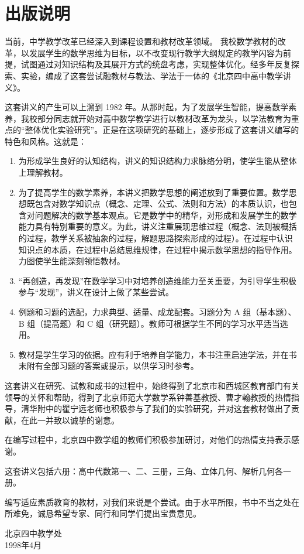 \chapter{出版说明}

当前，中学教学改革已经深入到课程设置和教材改革领域。
我校数学教材的改革，以发展学生的数学思维为目标，以不改变现行教学大纲规定的教学闪容为前提，试图通过对知识结构及其展开方式的统盘考虑，实现整体优化。经多年反复探索、实验，编成了这套尝试融教材与教法、学法于一体的《北京四中高中教学讲义》。

这套讲义的产生可以上溯到 1982 年。从那时起，为了发展学生智能，提高数学素养，我校部分同志就开始对高中数学教学进行以教材改革为龙头，以学法教育为重点的“整体优化实验研究”。正是在这项研究的基础上，逐步形成了这套讲义编写的特色和风格。这就是：
\begin{enumerate}
    \item 为形成学生良好的认知结构，讲义的知识结构力求脉络分明，使学生能从整体上理解教材。
    \item 为了提高学生的数学素养，本讲义把数学思想的阐述放到了重要位置。数学思想既包含对数学知识点（概念、定理、公式、法则和方法）的本质认识，也包含对问题解决的数学基本观点。它是数学中的精华，对形成和发展学生的数学能力具有特别重要的意义。为此，讲义注重展现思维过程（概念、法则被概括的过程，教学关系被抽象的过程，解题思路探索形成的过程）。在过程中认识知识点的本质，在过程中总结思维规律，在过程中揭示数学思想的指导作用。力图使学生能深刻领悟教材。
    \item “再创造，再发现”在数学学习中对培养创造维能力至关重要，为引导学生积极参与“发现”，讲义在设计上做了某些尝试。
    \item 例题和习题的选配，力求典型、适量、成龙配套。习题分为 A 组（基本题）、 B 组（提高题）和 C 组（研究题）。教师可根据学生不同的学习水平适当选用。
    \item 教材是学生学习的依据。应有利于培养自学能力，本书注重启迪学法，并在书末附有全部习题的答案或提示，以供学习时参考。
 \end{enumerate}   

这套讲义在研究、试教和成书的过程中，始终得到了北京市和西城区教育部门有关领导的关怀和帮助，得到了北京师范大学数学系钟善基教授、曹才翰教授的热情指导，清华附中的瞿宁远老师也积极参与了我们的实验研究，并对这套教材做出了贡献，在此一并致以诚挚的谢意。

在编写过程中，北京四中数学组的教师们积极参加研讨，对他们的热情支持表示感谢。

这套讲义包括六册：高中代数第一、二、三册，三角、立体几何、解析几何各一册。

编写适应素质教育的教材，对我们来说是个尝试。由于水平所限，书中不当之处在所难免，诚恳希望专家、同行和同学们提出宝贵意见。

\begin{flushright}
    北京四中教学处\\
    1998年4月
\end{flushright}